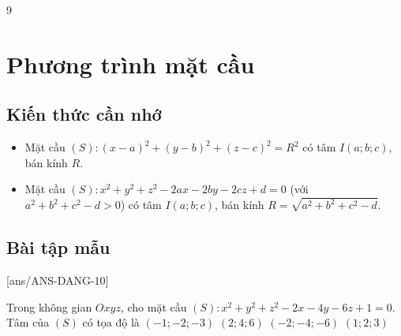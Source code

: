 \setcounter {section} {9}
\setcounter{ex}{0}
\section{Phương trình mặt cầu}
\subsection{Kiến thức cần nhớ}
\begin{khung}
	\begin{itemize}
		\item Mặt cầu $(S)\colon (x-a)^2+(y-b)^2+(z-c)^2=R^2$ có tâm $I(a;b;c)$, bán kính $R$.
		\item Mặt cầu $(S)\colon x^2+y^2+z^2-2ax-2by-2cz+d=0$ (với $a^2+b^2+c^2-d>0$) có tâm $I(a;b;c)$, bán kính $R=\sqrt{a^2+b^2+c^2-d}$.
	\end{itemize}
\end{khung}
\subsection{Bài tập mẫu}
[ans/ANS-DANG-10]
\begin{khung}
	\begin{vd}%
		Trong không gian $Oxyz$, cho mặt cầu $(S) \colon x^2+y^2+z^2-2x-4y-6z+1=0$. Tâm của $(S)$ có tọa độ là
		\choice
		{$(-1;-2;-3)$}
		{$(2;4;6)$}
		{$(-2;-4;-6)$}
		{\True $(1;2;3)$}
	\end{vd}
\end{khung}
